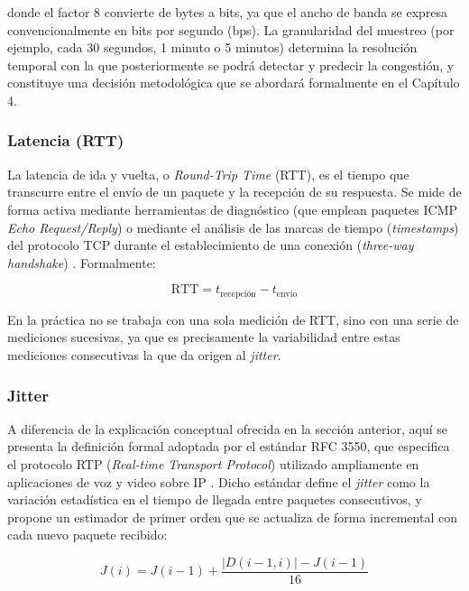 \documentclass[12pt]{report}
\begin{document}
donde el factor 8 convierte de bytes a bits, ya que el ancho de banda se expresa convencionalmente en bits por segundo (bps). La granularidad del muestreo (por ejemplo, cada 30 segundos, 1 minuto o 5 minutos) determina la resolución temporal con la que posteriormente se podrá detectar y predecir la congestión, y constituye una decisión metodológica que se abordará formalmente en el Capítulo 4.

\subsubsection*{Latencia (RTT)}

La latencia de ida y vuelta, o \textit{Round-Trip Time} (RTT), es el tiempo que transcurre entre el envío de un paquete y la recepción de su respuesta. Se mide de forma activa mediante herramientas de diagnóstico (que emplean paquetes ICMP \textit{Echo Request/Reply}) o mediante el análisis de las marcas de tiempo (\textit{timestamps}) del protocolo TCP durante el establecimiento de una conexión 
(\textit{three-way handshake}) \cite{kurose2017}. Formalmente:

\begin{equation}
    \text{RTT} = t_{\text{recepción}} - t_{\text{envío}}
    \label{eq:rtt}
\end{equation}

En la práctica no se trabaja con una sola medición de RTT, sino con una serie de mediciones sucesivas, ya que es precisamente la variabilidad entre estas mediciones consecutivas la que da origen al \textit{jitter}.

\subsubsection*{Jitter}

A diferencia de la explicación conceptual ofrecida en la sección anterior, aquí se presenta la definición formal adoptada por el estándar RFC 3550, que especifica el protocolo RTP (\textit{Real-time Transport Protocol}) utilizado ampliamente en aplicaciones de voz y video sobre IP \cite{rfc3550}. Dicho estándar define el \textit{jitter} como la variación estadística en el tiempo de llegada entre paquetes consecutivos, 
y propone un estimador de primer orden que se actualiza de forma incremental con cada nuevo paquete recibido:

\begin{equation}
    J(i) = J(i-1) + \frac{\left| D(i-1, i) \right| - J(i-1)}{16}
    \label{eq:jitter}
\end{equation}
\end{document}
